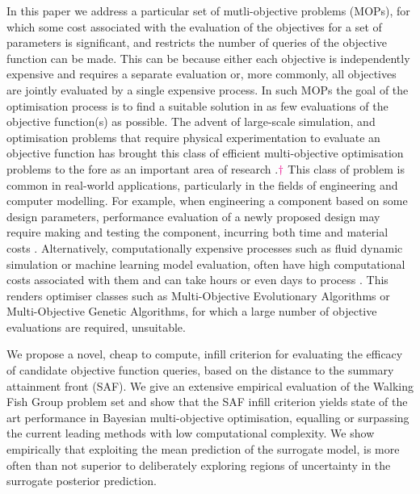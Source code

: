 \documentclass[conference]{IEEEtran}
\newcommand{\rmenote}[2][\textcolor{magenta}{\dagger}]{$#1$\marginpar{\color{magenta}\raggedright\tiny$#1$ #2}}
\begin{document}
In this paper we address a particular set of mutli-objective problems (MOPs), for which some cost associated with the evaluation of the objectives for a set of parameters is significant, and restricts the number of queries of the objective function can be made. This can be because either each objective is independently expensive and requires a separate evaluation or, more commonly, all objectives are jointly evaluated by a single expensive process. In such MOPs the goal of the optimisation process is to find a suitable solution in as few evaluations of the objective function(s) as possible. The advent of large-scale simulation, and optimisation problems that require physical experimentation to evaluate an objective function has brought this class of efficient multi-objective optimisation problems to the fore as an important area of research \cite{osio1996engineering,  li2017rapid, jeong2005efficient}.\rmenote{Could give some more references to work in this area if room} This class of problem is common in real-world applications, particularly in the fields of engineering and computer modelling. For example, when engineering a component based on some design parameters, performance evaluation of a newly proposed design may require making and testing the component, incurring both time and material costs \cite{fang2017design}. Alternatively, computationally expensive processes such as fluid dynamic simulation or machine learning model evaluation, often have high computational costs associated with them and can take hours or even days to process \cite{huband2005scalable}. This renders optimiser classes such as Multi-Objective Evolutionary Algorithms\cite{tanabe2017benchmarking,coello2007evolutionary} or Multi-Objective Genetic Algorithms\cite{tamaki1996multi}, for which a large number of objective evaluations are required, unsuitable.

We propose a novel, cheap to compute, infill criterion for evaluating the efficacy of candidate objective function queries, based on the distance to the summary attainment front (SAF). We give an extensive empirical evaluation of the Walking Fish Group problem set \cite{huband2005scalable} and show that the SAF infill criterion yields state of the art performance in Bayesian multi-objective optimisation, equalling or surpassing the current leading methods with low computational complexity. We show empirically that exploiting the mean prediction of the surrogate model, is more often than not superior to deliberately exploring regions of uncertainty in the surrogate posterior prediction.  
\end{document}
